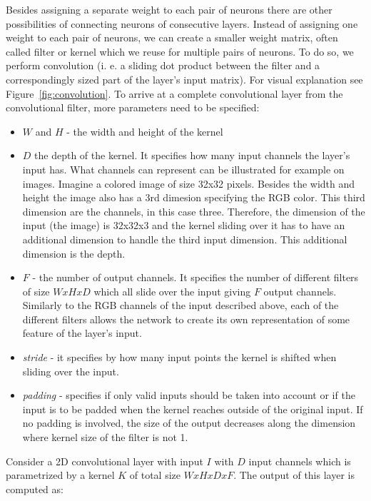 Besides assigning a separate weight to each pair of neurons there are other possibilities of connecting neurons of consecutive layers.
Instead of assigning one weight to each pair of neurons, we can create a smaller weight matrix, often called filter or kernel which we reuse for multiple pairs of neurons. 
To do so, we perform convolution (i. e. a sliding dot product between the filter and a correspondingly sized part of the layer's input matrix). 
For visual explanation see Figure~\ref{fig:convolution}.
To arrive at a complete convolutional layer from the convolutional filter, more parameters need to be specified:
\begin{itemize}
    \item $W$  and $H$ - the width and height of the kernel
    \item $D$ the depth of the kernel. 
    It specifies how many input channels the layer's input has.
    What channels can represent can be illustrated for example on images.
    Imagine a colored image of size 32x32 pixels.
    Besides the width and height the image also has a 3rd dimesion specifying the RGB color. This third dimension are the channels, in this case three.
    Therefore, the dimension of the input (the image) is 32x32x3 and the kernel sliding over it has to have an additional dimension to handle the third input dimension. This additional dimension is the depth.
    \item $F$ - the number of output channels. 
    It specifies the number of different filters of size $WxHxD$ which all slide over the input giving $F$ output channels. 
    Similarly to the RGB channels of the input described above, each of the different filters allows the network to create its own representation of some feature of the layer's input.    
    \item \textit{stride} - it specifies by how many input points the kernel is shifted when sliding over the input. 
    \item \textit{padding} - specifies if only valid inputs should be taken into account or if the input is to be padded when the kernel reaches outside of the original input.
    If no padding is involved, the size of the output decreases along the dimension where kernel size of the filter is not 1.
\end{itemize}

Consider a 2D convolutional layer with input $I$ with $D$ input channels which is parametrized by a kernel $K$ of total size $WxHxDxF$. The output of this layer is computed as:


